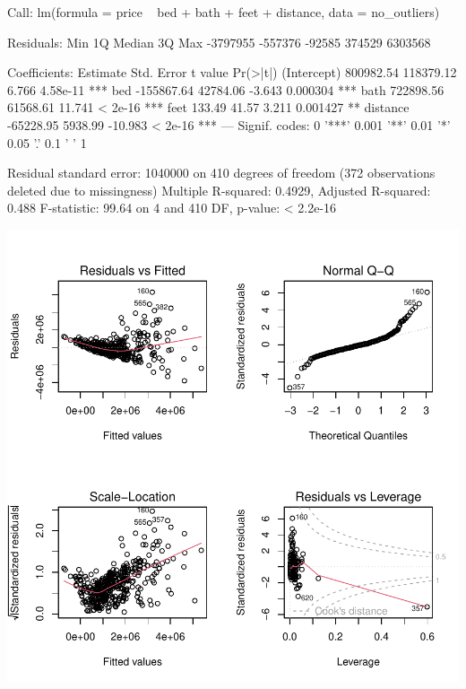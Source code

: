\documentclass[11pt, a4paper]{article}
\begin{document}
\begin{Schunk}
\begin{Soutput}
Call:
lm(formula = price ~ bed + bath + feet + distance, data = no_outliers)

Residuals:
     Min       1Q   Median       3Q      Max 
-3797955  -557376   -92585   374529  6303568 

Coefficients:
              Estimate Std. Error t value Pr(>|t|)    
(Intercept)  800982.54  118379.12   6.766 4.58e-11 ***
bed         -155867.64   42784.06  -3.643 0.000304 ***
bath         722898.56   61568.61  11.741  < 2e-16 ***
feet            133.49      41.57   3.211 0.001427 ** 
distance     -65228.95    5938.99 -10.983  < 2e-16 ***
---
Signif. codes:  0 '***' 0.001 '**' 0.01 '*' 0.05 '.' 0.1 ' ' 1

Residual standard error: 1040000 on 410 degrees of freedom
  (372 observations deleted due to missingness)
Multiple R-squared:  0.4929,	Adjusted R-squared:  0.488 
F-statistic: 99.64 on 4 and 410 DF,  p-value: < 2.2e-16
\end{Soutput}
\end{Schunk}
\includegraphics{exploratory_analysis-007}
\end{document}
